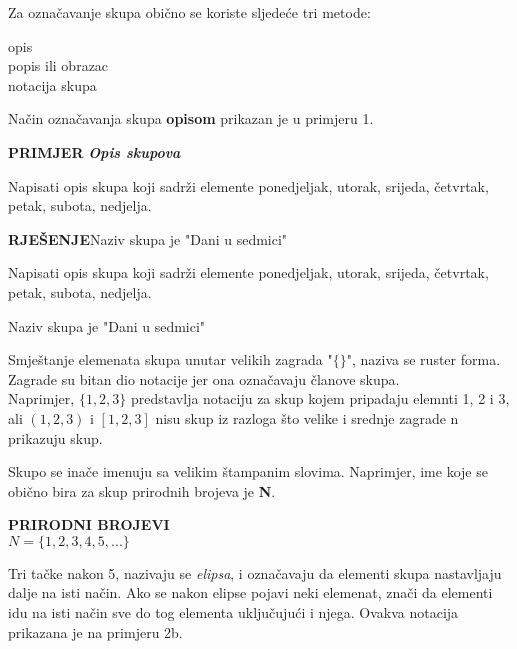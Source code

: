 \documentclass[a4paper, 14pt]{article}
\newcounter{exsolcounter}
\newcommand{\exsol}[3]{\refstepcounter{exsolcounter} \par \textbf{PRIMJER \theexsolcounter} \textbf{\textit{#1}} \smallskip\par\noindent\hangindent=1cm\hangafter=0 #2\setlength{\leftskip}{0cm}\smallskip\par{\textbf{RJEŠENJE}\qquad #3}}
\begin{document}
Za označavanje skupa obično se koriste sljedeće tri metode:
\begin{center}
opis\\
popis ili obrazac\\
notacija skupa
\end{center}
Način označavanja skupa \textbf{opisom} prikazan je u primjeru 1.

\exsol{Opis skupova}{Napisati opis skupa koji sadrži elemente ponedjeljak, utorak, srijeda, četvrtak, petak, subota, nedjelja.}{Naziv skupa je "Dani u sedmici"}
\begin{tcolorbox}[title=\large PRIMJER \hfill\small\textbf{"Opis skupova}"]
Napisati opis skupa koji sadrži elemente ponedjeljak, utorak, srijeda, četvrtak, petak, subota, nedjelja.

\begin{tcolorbox}[title=RJEŠENJE]
\begin{center}
Naziv skupa je "Dani u sedmici"
\end{center}
\end{tcolorbox}
\end{tcolorbox}

Smještanje elemenata skupa unutar velikih zagrada "$\{ \}$", naziva se ruster forma. Zagrade su bitan dio notacije jer ona označavaju članove skupa.\\
Naprimjer, $\{1, 2, 3\}$ predstavlja notaciju za skup kojem pripadaju elemnti 1, 2 i 3, ali $(1, 2, 3)$ i $[1, 2, 3]$ nisu skup iz razloga što velike i srednje zagrade n prikazuju skup.

Skupo se inače imenuju sa velikim štampanim slovima. Naprimjer, ime koje se obično bira za skup prirodnih brojeva je \textbf{N}.\\
\begin{tcolorbox}
\begin{center}
\textbf{\textsc{PRIRODNI BROJEVI}}\\
$N = \{1, 2, 3, 4, 5, ... \}$
\end{center}
\end{tcolorbox}
Tri tačke nakon 5, nazivaju se \textit{elipsa}, i označavaju da elementi skupa nastavljaju dalje na isti način. Ako se nakon elipse pojavi neki elemenat, znači da elementi idu na isti način sve do tog elementa uključujući i njega. Ovakva notacija prikazana je na primjeru 2b.
\end{document}
